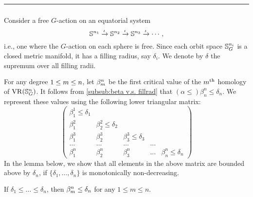\noindent\rule{\textwidth}{0.4pt}

\subsubsection{}\label{subsub:foundamental_bar_rpn_lemma}

Consider a free \(G\)-action on an equatorial system
\[
\mathbb{S}^{n_1} \xrightarrow{\iota} \mathbb{S}^{n_2} \xrightarrow{\iota} \mathbb{S}^{n_3} \xrightarrow{\iota} \dotsb,
\]
i.e., one where the \(G\)-action on each sphere is free.
Since each orbit space \(\mathbb{S}^{n_i}_G\) is a closed metric manifold, it has a filling radius, say \(\delta_i\).
We denote by \(\delta\) the supremum over all filling radii.


For any degree $1 \leq m \leq n$, let $\beta_{m}^{n}$ be the first critical value of the $m^{\mathrm{th}}$ homology of $\operatorname{VR}(\mathbb{S}^n_G)$.
It follows from \cref{subsub:beta v.s. fillrad} that $(\alpha \leq) \beta_{n}^{n} \leq \delta_n$.
We represent these values using the following lower triangular matrix:
\[
\begin{pmatrix}
	\beta_{1}^{1}\leq \delta_1 & & &&\\
	\beta_1^2 & \beta_{2}^{2} \leq \delta_2 & &&\\
	\beta_1^3 & \beta_{2}^{3} & \beta_{3}^{3} \leq \delta_3 &&\\
	\dots & \dots & \dots & \dots &\\
	\beta_1^n & \beta_2^n & \beta_3^n & \dots & \beta_n^n \leq \delta_n
\end{pmatrix}
\]
In the lemma below, we show that all elements in the above matrix are bounded above by $\delta_n$, if $\{\delta_1, \dots, \delta_n\}$ is monotonically non-decreasing.

\medskip\lemma
If $\delta_1 \leq \dots \leq \delta_n$, then $\beta_{m}^{n} \leq \delta_n$ for any $1 \leq m \leq n$.

